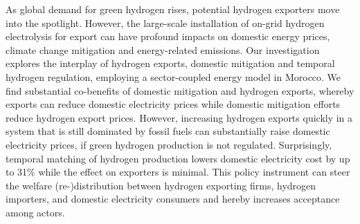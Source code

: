




As global demand for green hydrogen rises, potential hydrogen exporters move into the spotlight.
However, the large-scale installation of on-grid hydrogen electrolysis for export can have profound impacts on domestic energy prices, climate change mitigation and energy-related emissions.
Our investigation explores the interplay of hydrogen exports, domestic mitigation and temporal hydrogen regulation, employing a sector-coupled energy model in Morocco. 
We find substantial co-benefits of domestic mitigation and hydrogen exports, whereby exports can reduce domestic electricity prices while domestic mitigation efforts reduce hydrogen export prices.
However, increasing hydrogen exports quickly in a system that is still dominated by fossil fuels can substantially raise domestic electricity prices, if green hydrogen production is not regulated.
Surprisingly, temporal matching of hydrogen production lowers domestic electricity cost by up to 31\% while the effect on exporters is minimal. 
This policy instrument can steer the welfare (re-)distribution between hydrogen exporting firms, hydrogen importers, and domestic electricity consumers and hereby increases acceptance among actors.

